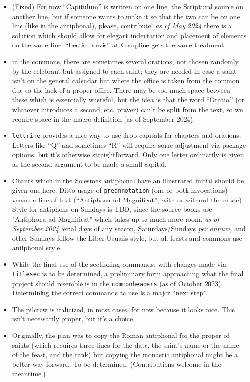 \documentclass[11pt]{article}
\begin{document}
\begin{itemize}
\item
(Fixed) For now ``Capitulum'' is written on one line, the Scriptural source on another line, but if someone wants to make it so that the two can be on one line (like in the antiphonal), please, contribute! \emph{as of May 2024} there is a solution which should allow for elegant indentation and placement of elements on the same line. ``Lectio brevis'' at Compline gets the same treatment.
\item in the commons, there are sometimes several orations, not chosen randomly by the celebrant but assigned to each saint; they are needed in case a saint isn't on the general calendar but where the office is taken from the common due to the lack of a proper office. There may be too much space between these which is essentially wasteful, but the idea is that the word ``Oratio.'' (or whatever introduces a second, etc. prayer) can't be split from the text, so we require space in the macro definition (as of September 2024).
\item
\verb|lettrine| provides a nice way to use drop capitals for chapters and orations. Letters like ``Q'' and sometimes ``R'' will require some adjustment via package options, but it's otherwise straightforward. Only one letter ordinarily is given as the second argument to be made a small capital.
\item
Chants which in the Solesmes antiphonal have an illustrated initial should be given one here. Ditto usage of \verb|greannotation| (one or both invocations) versus a line of text (``Antiphona ad Magnificat'', with or without the mode). Style for antiphons on Sundays is TBD, since the source books use "Antiphona ad Magnificat" which takes up so much more room. \emph{as of September 2024} ferial days of any season, Saturdays/Sundays \textit{per annum,} and other Sundays follow the Liber Usualis style, but all feasts and commons use antiphonal style.
\item While the final use of the sectioning commands, with changes made via \verb|titlesec| is  to be determined, a preliminary form approaching what the final project should resemble is in the \verb|commonheaders| (as of October 2023). Determining the correct commands to use is a major ``next step''.
\item
The pilcrow is italicized, in most cases, for now because it looks nice. This isn't necessarily proper, but it's a choice.
\item
Originally, the plan was to copy the Roman antiphonal for the proper of saints (which requires three lines for the date, the saint's name or the name of the feast, and the rank) but copying the monastic antiphonal might be a better way forward. To be determined. (Contributions welcome in the meantime.)

\end{itemize}
\end{document}
